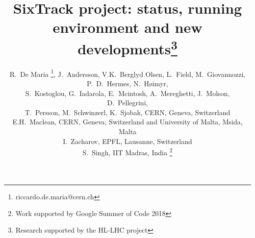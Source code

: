 \documentclass[a4paper,
              ]{jacow}
\begin{document}
\title{SixTrack project: status, running environment and new developments\thanks{Research supported by the HL-LHC project}}

\author{
R.~De Maria \thanks{riccardo.de.maria@cern.ch},
J.~Andersson,
V.K.~Berglyd Olsen,
L.~Field,
M.~Giovannozzi,
P.~D.~Hermes,
N.~H\o imyr, \\
S.~Kostoglou,
G.~Iadarola,
E.~Mcintosh,
A.~Mereghetti,
J.~Molson,
D.~Pellegrini,\\
T.~Persson,
M.~Schwinzerl,
K.~Sjobak,
CERN, Geneva, Switzerland \\
E.H.~Maclean, CERN, Geneva, Switzerland and University of Malta, Msida, Malta\\
I.~Zacharov, EPFL, Lausanne, Switzerland \\
S.~Singh, IIT Madras, India \thanks{Work supported by Google Summer of Code 2018}
}
\maketitle

\end{document}
